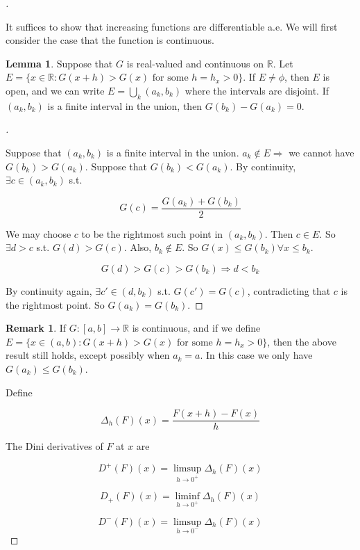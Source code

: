 \documentclass{article}
\theoremstyle{definition}
\newtheorem{lem}{Lemma}
\newtheorem{rem}{Remark}
\newenvironment{proofs}[1][\proofname]{%
  \begin{proof}[#1]$ $\par\nobreak\ignorespaces
}{%
  \end{proof}
}
\begin{document}
\begin{proofs}

	It suffices to show that increasing functions are differentiable a.e. We will first consider the case that the function is continuous. 

	\begin{lem}
	  Suppose that $G$ is real-valued and continuous on $\mathbb{R}$. Let $E = \{x \in \mathbb{R}: G(x + h) > G(x) \text{ for some } h = h_x > 0 \}$. If $E \neq \phi$, then $E$ is open, and we can write $E = \bigcup_k (a_k, b_k)$ where the intervals are disjoint. If $(a_k, b_k)$ is a finite interval in the union, then $G(b_k) - G(a_k) = 0$.  
	\end{lem}

	\begin{proofs}
	  Suppose that $(a_k, b_k)$ is a finite interval in the union. $a_k \notin E \Rightarrow $ we cannot have $G(b_k) > G(a_k)$. Suppose that $G(b_k) < G(a_k)$. By continuity, $\exists c \in (a_k, b_k)$ s.t. 

	  $$G(c) = \frac{G(a_k) + G(b_k)}{2}$$

	  We may choose $c$ to be the rightmost such point in $(a_k, b_k)$. Then $c \in E$. So $\exists d > c$ s.t. $G(d) > G(c)$. Also, $b_k \notin E$. So $G(x) \leq G(b_k) \forall x \leq b_k$. 

	  $$G(d) > G(c) > G(b_k) \Rightarrow d < b_k$$

	  By continuity again, $\exists c' \in (d, b_k)$ s.t. $G(c') = G(c)$, contradicting that $c$ is the rightmost point. So $G(a_k) = G(b_k)$. 
	\end{proofs}

	\begin{rem}
	  If $G:[a, b] \rightarrow \mathbb{R}$ is continuous, and if we define $E = \{ x \in (a, b): G(x + h) > G(x) \text{ for some } h = h_x > 0 \}$, then the above result still holds, except possibly when $a_k = a$. In this case we only have $G(a_k) \leq G(b_k)$. 
	\end{rem}

	Define 

	$$\Delta_h (F)(x) = \frac{F(x + h) - F(x)}{h}$$

	The Dini derivatives of $F$ at $x$ are

	$$D^+(F)(x) = \limsup_{h \to 0^+} \Delta_h (F)(x)$$

	$$D_+(F)(x) = \liminf_{h \to 0^+} \Delta_h (F)(x)$$

	$$D^-(F)(x) = \limsup_{h \to 0^-} \Delta_h (F)(x)$$


\end{proofs}
\end{document}
